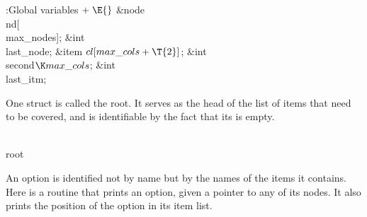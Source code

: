 \B{}:Global variables\X${}\mathrel+\E{}$\6
\&{node} \\{nd}[\\{max\_nodes}];\6
\&{int} \\{last\_node};\6
\&{item} ${}\\{cl}[\\{max\_cols}+\T{2}]{}$;\6
\&{int} \\{second}${}\K\\{max\_cols}{}$;\6
\&{int} \\{last\_itm};%
\par
\fi

One  struct is called the root. It serves as the head of the
list of items that need to be covered, and is identifiable by the fact
that its  is empty.

\Y\B\4\D\\{root}\5
\par
\fi

An option is identified not by name but by the names of the items it
contains.
Here is a routine that prints an option, given a pointer to any of its
nodes. It also prints the position of the option in its item list.


